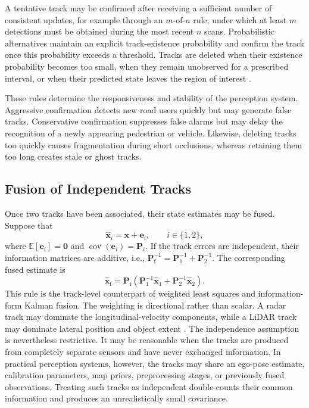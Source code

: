 A tentative track may be confirmed after receiving a sufficient number of
consistent updates, for example through an $m$-of-$n$ rule, under which at
least $m$ detections must be obtained during the most recent $n$ scans.
Probabilistic alternatives maintain an explicit track-existence
probability and confirm the track once this probability exceeds a
threshold. Tracks are deleted when their existence probability becomes too
small, when they remain unobserved for a prescribed interval, or when their
predicted state leaves the region of interest
\cite{blackman1999design,barshalom2011tracking}.

These rules determine the responsiveness and stability of the perception
system. Aggressive confirmation detects new road users quickly but may
generate false tracks. Conservative confirmation suppresses false alarms
but may delay the recognition of a newly appearing pedestrian or vehicle.
Likewise, deleting tracks too quickly causes fragmentation during short
occlusions, whereas retaining them too long creates stale or ghost tracks.

\subsection{Fusion of Independent Tracks}

Once two tracks have been associated, their state estimates may be fused.
Suppose that
\begin{equation}
\widehat{\mathbf{x}}_{i}=\mathbf{x}+\mathbf{e}_{i},\qquad i\in\{1,2\},
\label{eq:local-track-error}
\end{equation}
where
$\mathbb{E}[\mathbf{e}_{i}]=\mathbf{0}$ and $\operatorname{cov}(\mathbf{e}_{i})=\mathbf{P}_{i}$. If the track errors are independent, their information matrices are
additive, i.e.,  $\mathbf{P}_{\mathrm{f}}^{-1}=\mathbf{P}_{1}^{-1}+\mathbf{P}_{2}^{-1}$. The corresponding fused estimate is
\begin{equation}
\widehat{\mathbf{x}}_{\mathrm{f}}=\mathbf{P}_{\mathrm{f}}\left(\mathbf{P}_{1}^{-1}\widehat{\mathbf{x}}_{1}+\mathbf{P}_{2}^{-1}\widehat{\mathbf{x}}_{2}\right).
\label{eq:independent-track-fusion-state}
\end{equation}
This rule is the track-level counterpart of weighted least squares and information-form Kalman fusion. The weighting is directional rather than scalar. A radar track may dominate the longitudinal-velocity components, while a LiDAR track may dominate lateral position and object extent
\cite{barshalom1995multitarget,barshalom2011tracking}. The independence assumption is nevertheless restrictive. It may be
reasonable when the tracks are produced from completely separate sensors
and have never exchanged information. In practical perception systems,
however, the tracks may share an ego-pose estimate, calibration parameters,
map priors, preprocessing stages, or previously fused observations.
Treating such tracks as independent double-counts their common information
and produces an unrealistically small covariance.

